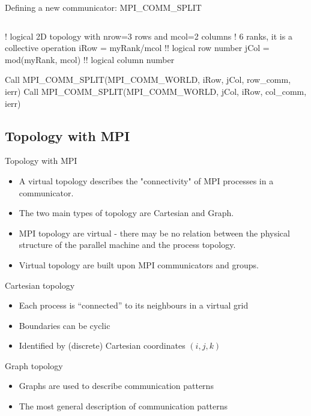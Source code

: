 \documentclass[aspectratio=43]{beamer}
\begin{document}
\begin{frame}[fragile]{Defining a new communicator: MPI\_COMM\_SPLIT}
\begin{columns}
\end{columns}
\begin{Fortranlisting}[]{}
! logical 2D topology with nrow=3 rows and mcol=2 columns
! 6 ranks, it is a collective operation
iRow = myRank/mcol       !! logical row number
jCol = mod(myRank, mcol) !! logical column number

Call MPI_COMM_SPLIT(MPI_COMM_WORLD, iRow, jCol, row_comm, ierr)
Call MPI_COMM_SPLIT(MPI_COMM_WORLD, jCol, iRow, col_comm, ierr)
\end{Fortranlisting}
\end{frame}


\subsection{Topology with MPI}
\begin{frame}[fragile]{Topology with MPI}
\begin{itemize}
\item A virtual topology describes the "connectivity" of MPI processes in a communicator.
\item The two main types of topology are Cartesian and Graph.
\item MPI topology are virtual - there may be no relation between the physical structure of the parallel machine and the process topology.
\item Virtual topology are built upon MPI communicators and groups.
\end{itemize}
\begin{blue1block}{Cartesian topology}
\begin{itemize}
\item Each process is ``connected'' to its neighbours in a virtual grid
\item Boundaries can be cyclic
\item Identified by (discrete) Cartesian coordinates $(i, j, k)$
\end{itemize}
\end{blue1block}
\begin{blue1block}{Graph topology}
\begin{itemize}
\item Graphs are used to describe communication patterns
\item The most general description of communication patterns
\end{itemize}
\end{blue1block}
\end{frame}
\end{document}
